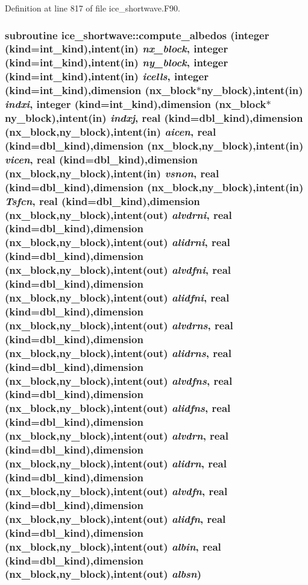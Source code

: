 Definition at line 817 of file ice\_\-shortwave.F90.\hypertarget{namespaceice__shortwave_acd85d1094cb6791a6745cc10dfcebc31}{
\subsubsection[{compute\_\-albedos}]{\setlength{\rightskip}{0pt plus 5cm}subroutine ice\_\-shortwave::compute\_\-albedos (integer (kind=int\_\-kind),intent(in) {\em nx\_\-block}, \/  integer (kind=int\_\-kind),intent(in) {\em ny\_\-block}, \/  integer (kind=int\_\-kind),intent(in) {\em icells}, \/  integer (kind=int\_\-kind),dimension (nx\_\-block$\ast$ny\_\-block),intent(in) {\em indxi}, \/  integer (kind=int\_\-kind),dimension (nx\_\-block$\ast$ny\_\-block),intent(in) {\em indxj}, \/  real (kind=dbl\_\-kind),dimension (nx\_\-block,ny\_\-block),intent(in) {\em aicen}, \/  real (kind=dbl\_\-kind),dimension (nx\_\-block,ny\_\-block),intent(in) {\em vicen}, \/  real (kind=dbl\_\-kind),dimension (nx\_\-block,ny\_\-block),intent(in) {\em vsnon}, \/  real (kind=dbl\_\-kind),dimension (nx\_\-block,ny\_\-block),intent(in) {\em Tsfcn}, \/  real (kind=dbl\_\-kind),dimension (nx\_\-block,ny\_\-block),intent(out) {\em alvdrni}, \/  real (kind=dbl\_\-kind),dimension (nx\_\-block,ny\_\-block),intent(out) {\em alidrni}, \/  real (kind=dbl\_\-kind),dimension (nx\_\-block,ny\_\-block),intent(out) {\em alvdfni}, \/  real (kind=dbl\_\-kind),dimension (nx\_\-block,ny\_\-block),intent(out) {\em alidfni}, \/  real (kind=dbl\_\-kind),dimension (nx\_\-block,ny\_\-block),intent(out) {\em alvdrns}, \/  real (kind=dbl\_\-kind),dimension (nx\_\-block,ny\_\-block),intent(out) {\em alidrns}, \/  real (kind=dbl\_\-kind),dimension (nx\_\-block,ny\_\-block),intent(out) {\em alvdfns}, \/  real (kind=dbl\_\-kind),dimension (nx\_\-block,ny\_\-block),intent(out) {\em alidfns}, \/  real (kind=dbl\_\-kind),dimension (nx\_\-block,ny\_\-block),intent(out) {\em alvdrn}, \/  real (kind=dbl\_\-kind),dimension (nx\_\-block,ny\_\-block),intent(out) {\em alidrn}, \/  real (kind=dbl\_\-kind),dimension (nx\_\-block,ny\_\-block),intent(out) {\em alvdfn}, \/  real (kind=dbl\_\-kind),dimension (nx\_\-block,ny\_\-block),intent(out) {\em alidfn}, \/  real (kind=dbl\_\-kind),dimension (nx\_\-block,ny\_\-block),intent(out) {\em albin}, \/  real (kind=dbl\_\-kind),dimension (nx\_\-block,ny\_\-block),intent(out) {\em albsn})}}
\label{namespaceice__shortwave_acd85d1094cb6791a6745cc10dfcebc31}



